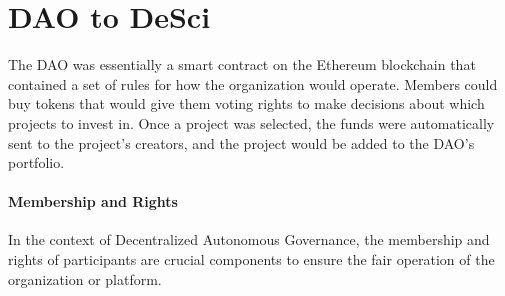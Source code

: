 \documentclass[lettersize,journal]{IEEEtran}
\begin{document}
  

\section{DAO to DeSci}

The DAO was essentially a smart contract on the Ethereum blockchain that contained a set of rules for how the organization would operate. Members could buy tokens that would give them voting rights to make decisions about which projects to invest in. Once a project was selected, the funds were automatically sent to the project's creators, and the project would be added to the DAO's portfolio.


\paragraph{Membership and Rights}
In the context of Decentralized Autonomous Governance, the membership and rights of participants are crucial components to ensure the fair operation of the organization or platform. 
\end{document}
